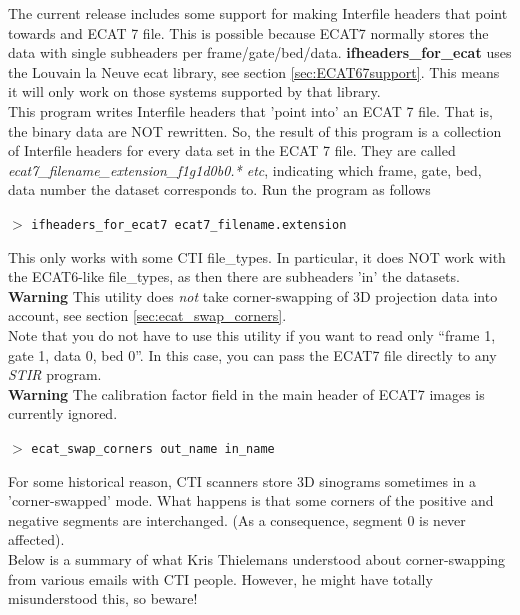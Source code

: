 \documentclass{article}
\newcommand{\cmdline}[1]{\par \noindent $>$ \texttt{#1}\par}
\begin{document}
{ 
}

The current release includes some support for making Interfile 
headers that point towards and ECAT 7 file. This is possible 
because ECAT7 normally stores the data with single subheaders 
per frame/gate/bed/data. \textbf{ifheaders\_for\_ecat} uses the Louvain 
la Neuve ecat library, see section \ref{sec:ECAT67support}. 
This means it will only work on those systems 
supported by that library. \\
This program writes Interfile headers that 'point into' an ECAT 
7 file. That is, the binary data are NOT rewritten. So, the result 
of this program is a collection of Interfile headers for every 
data set in the ECAT 7 file. They are called \textit{ecat7\_filename\_extension\_f1g1d0b0.* 
etc}, indicating which frame, gate, bed, data number the dataset 
corresponds to. Run the program as follows
\cmdline{ifheaders\_for\_ecat7 ecat7\_filename.extension}


This only works with some CTI file\_types. In particular, it 
does NOT work with the ECAT6-like file\_types, as then there 
are subheaders 'in' the datasets.\\
\textbf{Warning} This utility does \textit{not} take corner-swapping of 
3D projection data into account, see section \ref{sec:ecat_swap_corners}.\\
Note that you do not have to use this utility if you want to 
read only ``frame 1, gate 1, data 0, bed 0''. In this case, you 
can pass the ECAT7 file directly to any \textit{STIR} program.
\\
\textbf{Warning} The calibration factor field in the main header of ECAT7 images
is currently ignored.

{ 
}
\label{sec:ecat_swap_corners}

{ 
}
\cmdline{ecat\_swap\_corners out\_name in\_name}

{ 
}

For some historical reason, CTI scanners store 3D sinograms sometimes 
in a 'corner-swapped' mode. What happens is that some corners 
of the positive and negative segments are interchanged. (As a 
consequence, segment 0 is never affected).\\
Below is a summary of what Kris Thielemans understood about corner-swapping 
from various emails with CTI people. However, he might have totally 
misunderstood this, so beware!
\end{document}
